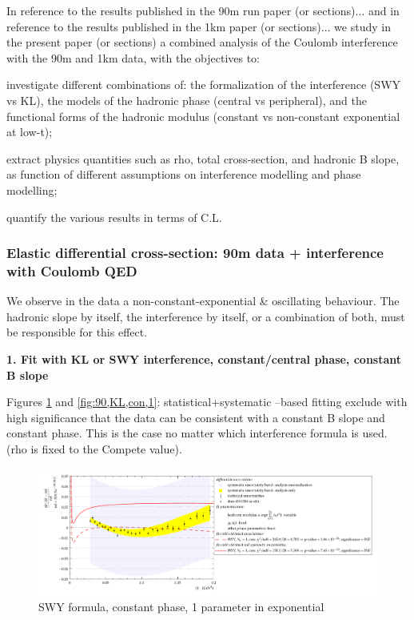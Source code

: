In reference to the results published in the 90m run paper (or sections)... and in reference to the results published in the 1km paper (or sections)... we study in the present paper (or sections) a combined analysis of the Coulomb interference with the 90m and 1km data, with the objectives to:

\> investigate different combinations of: the formalization of the interference (SWY vs
KL), the models of the hadronic phase (central vs peripheral), and the functional
forms of the hadronic modulus (constant vs non-constant exponential at low-t);

\> extract physics quantities such as rho, total cross-section, and hadronic B slope, as
function of different assumptions on interference modelling and phase modelling;

\> quantify the various results in terms of C.L.


\subsubsection{Elastic differential cross-section: 90m data + interference with Coulomb QED}


We observe in the data a non-constant-exponential \& oscillating behaviour.
The hadronic slope by itself, the interference by itself, or a combination of both, must be
responsible for this effect.

{\bf 1. Fit with KL or SWY interference, constant/central phase, constant B slope}

Figures \ref{fig:90,SWY,con,1} and \ref{fig:90,KL,con,1}: statistical+systematic –based fitting exclude with high significance that the data can be
consistent with a constant B slope and constant phase. This is the case no matter which
interference formula is used. (rho is fixed to the Compete value).

\begin{figure}
\begin{center}
\includegraphics[width=18cm]{simone/90/SWY,con,1,stat-stat+syst.pdf}
\vskip-3mm
\caption{SWY formula, constant phase, 1 parameter in exponential}
\label{fig:90,SWY,con,1}
\end{center}
\end{figure}

